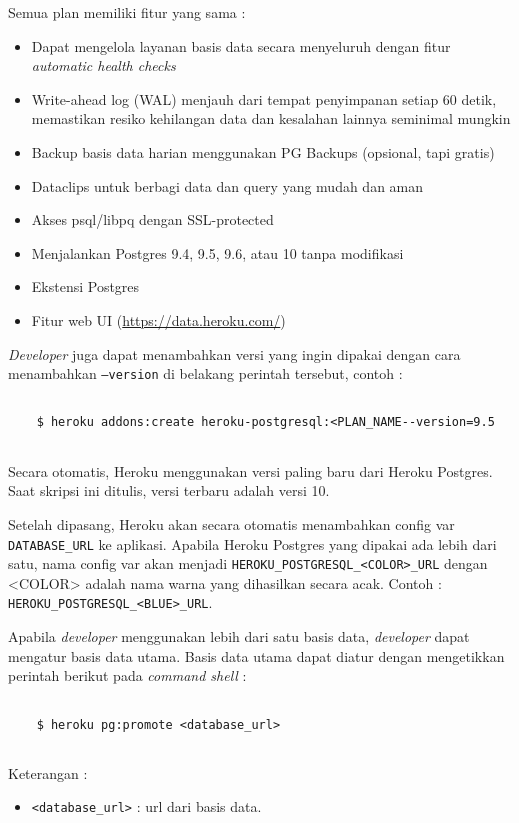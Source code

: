 Semua plan memiliki fitur yang sama :
\begin{itemize}
\item Dapat mengelola layanan basis data secara menyeluruh dengan fitur \textit{automatic health checks}
\item Write-ahead log (WAL) menjauh dari tempat penyimpanan setiap 60 detik, memastikan resiko kehilangan data dan kesalahan lainnya seminimal mungkin
\item Backup basis data harian menggunakan PG Backups (opsional, tapi gratis)
\item Dataclips untuk berbagi data dan query yang mudah dan aman
\item Akses psql/libpq dengan SSL-protected
\item Menjalankan Postgres 9.4, 9.5, 9.6, atau 10 tanpa modifikasi
\item Ekstensi Postgres
\item Fitur web UI (\url{https://data.heroku.com/})
\end{itemize}

\textit{Developer} juga dapat menambahkan versi yang ingin dipakai dengan cara menambahkan \texttt{--version} di belakang perintah tersebut, contoh :
\begin{lstlisting}
	
	$ heroku addons:create heroku-postgresql:<PLAN_NAME--version=9.5
	
\end{lstlisting}
Secara otomatis, Heroku menggunakan versi paling baru dari Heroku Postgres. Saat skripsi ini ditulis, versi terbaru adalah versi 10.

Setelah dipasang, Heroku akan secara otomatis menambahkan config var \texttt{DATABASE\_URL} ke aplikasi. Apabila Heroku Postgres yang dipakai ada lebih dari satu, nama config var akan menjadi \texttt{HEROKU\_POSTGRESQL\_<COLOR>\_URL} dengan <COLOR> adalah nama warna yang dihasilkan secara acak. Contoh : \texttt{HEROKU\_POSTGRESQL\_<BLUE>\_URL}.

Apabila \textit{developer} menggunakan lebih dari satu basis data, \textit{developer} dapat mengatur basis data utama. Basis data utama dapat diatur dengan mengetikkan perintah berikut pada \textit{command shell} :
\begin{lstlisting}
	
	$ heroku pg:promote <database_url>
	
\end{lstlisting}
Keterangan :
\begin{itemize}
\item \texttt{<database\_url>} : url dari basis data.
\end{itemize}

